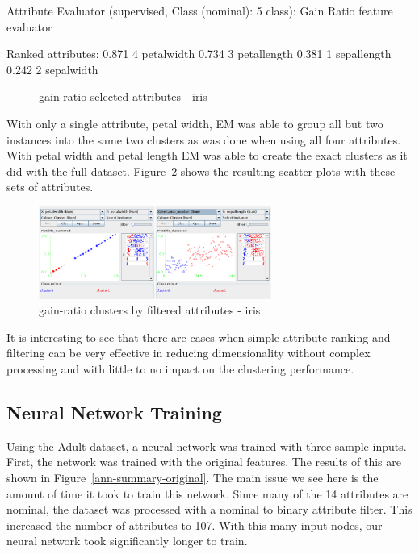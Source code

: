 \documentclass{sig-alternate}
\begin{document}
\begin{verbbox}

Attribute Evaluator (supervised, Class (nominal): 5 class):
    Gain Ratio feature evaluator

Ranked attributes:
 0.871  4 petalwidth
 0.734  3 petallength
 0.381  1 sepallength
 0.242  2 sepalwidth
\end{verbbox}
\normalsize

\begin{figure}[!htbp]
    \centering
    \theverbbox
    \caption{gain ratio selected attributes - iris\label{gain-iris}}
\end{figure}


With only a single attribute, petal width, EM was able to group all but two instances into the same two clusters as was done when using all four attributes. With petal width and petal length EM was able to create the exact clusters as it did with the full dataset. Figure~\ref{gain-scatter-iris} shows the resulting scatter plots with these sets of attributes.

\begin{figure}[!htbp]
    \centering
    \includegraphics[width=3in]{part2/iris/gain.pdf}
    \caption{gain-ratio clusters by filtered attributes - iris\label{gain-scatter-iris}}
\end{figure} 

It is interesting to see that there are cases when simple attribute ranking and filtering can be very effective in reducing dimensionality without complex processing and with little to no impact on the clustering performance.



\subsection{Neural Network Training}

Using the Adult dataset, a neural network was trained with three sample inputs. First, the network was trained with the original features. The results of this are shown in Figure~\ref{ann-summary-original}. The main issue we see here is the amount of time it took to train this network. Since many of the 14 attributes are nominal, the dataset was processed with a nominal to binary attribute filter. This increased the number of attributes to 107. With this many input nodes, our neural network took significantly longer to train.
\end{document}
